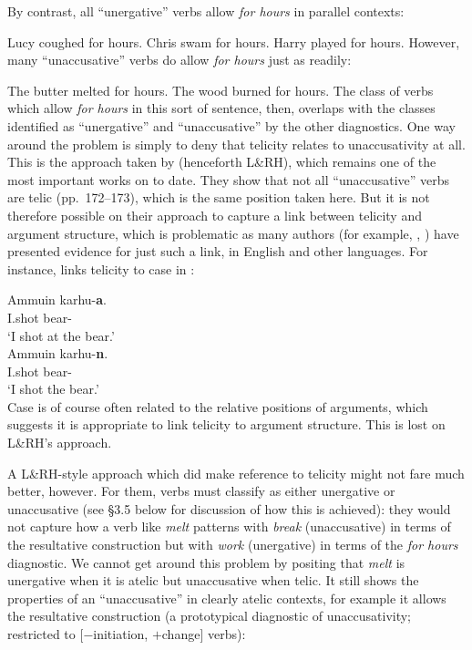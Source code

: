 \documentclass[output=paper]{langsci/langscibook}
\begin{document}
\ea
    \z
\z
By contrast, all \enquote{unergative} verbs allow \emph{for hours} in
parallel contexts:

\ea
    \ea Lucy coughed for hours.
    \ex Chris swam for hours.
    \ex Harry played for hours.
    \z
\z
However, many \enquote{unaccusative} verbs do allow \emph{for hours} just as
readily:

\ea
    \ea The butter melted for hours.
    \ex The wood burned for hours.
    \z
\z
The class of verbs which allow \emph{for hours} in this sort of sentence,
then, overlaps with the classes identified as \enquote{unergative} and
\enquote{unaccusative} by the other diagnostics. One way around the problem is
simply to deny that telicity relates to unaccusativity at all. This is the
approach taken by \citet{LevinRappaportHovav1995} (henceforth L\&RH), which
remains one of the most important works on  to date.  They
show that not all \enquote{unaccusative} verbs are telic (pp.\ 172--173), which is
the same position taken here. But it is not therefore possible on their
approach to capture a link between telicity and argument structure, which is
problematic as many authors (for example, \citealt{Tenny1987},
\citealt{Borer2005}) have presented evidence for just such a link, in English
and other languages. For instance, \citet{Kiparsky1998} links telicity to case
in :

\ea {}
    \ea
        \gll    Ammuin   karhu-\textbf{a}.\\
               I.shot   bear-\Part\\
        \glt   \enquote*{I shot at the bear.}\\
    \ex
        \gll    Ammuin   karhu-\textbf{n}.\\
                I.shot   bear-\Acc\\
        \glt   \enquote*{I shot the bear.}\\
    \z
\z
Case is of course often related to the relative positions of arguments, which
suggests it is appropriate to link telicity to argument structure. This is lost
on L\&RH’s approach.

A L\&RH-style approach which did make reference to telicity might not fare
much better, however. For them, verbs must classify as either unergative or
unaccusative (see §3.5 below for discussion of how this is achieved): they
would not capture how a verb like \emph{melt} patterns with \emph{break}
(unaccusative) in terms of the resultative construction but with \emph{work}
(unergative) in terms of the \emph{for hours} diagnostic. We cannot get
around this problem by positing that \emph{melt} is unergative when it is
atelic but unaccusative when telic. It still shows the properties of an
\enquote{unaccusative} in clearly atelic contexts, for example it allows the
resultative construction (a prototypical diagnostic of unaccusativity;
restricted to [$-$initiation, $+$change] verbs):
\end{document}
